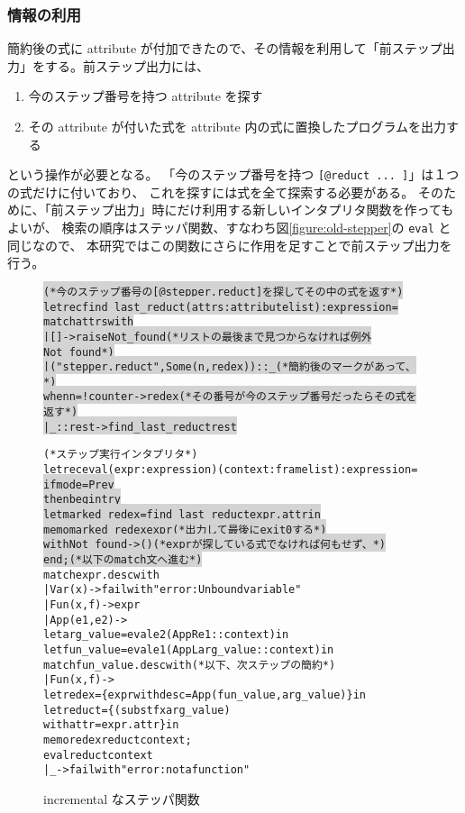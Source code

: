 \subsubsection{情報の利用}
簡約後の式に attribute が付加できたので、その情報を利用して「前ステップ出力」をする。前ステップ出力には、
\begin{enumerate}
\item 今のステップ番号を持つ attribute を探す
\item その attribute が付いた式を attribute 内の式に置換したプログラムを出力する
\end{enumerate}
という操作が必要となる。
「今のステップ番号を持つ \texttt{[@reduct ... ]}」は１つの式だけに付いており、
これを探すには式を全て探索する必要がある。
そのために、「前ステップ出力」時にだけ利用する新しいインタプリタ関数を作ってもよいが、
検索の順序はステッパ関数、すなわち図\ref{figure:old-stepper}の \texttt{eval} と同じなので、
本研究ではこの関数にさらに作用を足すことで前ステップ出力を行う。

\begin{figure}
\begin{spacing}{0.8}
\begin{alltt}
\colorbox{lightgray}{ (* 今のステップ番号の [@stepper.reduct] を探してその中の式を返す *)}
\colorbox{lightgray}{let rec find_last_reduct (attrs : attribute list) : expression =}
\colorbox{lightgray}{  match attrs with}
\colorbox{lightgray}{  | [] -> raise Not_found      (* リストの最後まで見つからなければ例外 Not_found *)}
\colorbox{lightgray}{  | ("stepper.reduct", Some (n, redex)) :: _        (* 簡約後のマークがあって、 *)}
\colorbox{lightgray}{    when n = !counter -> redex (* その番号が今のステップ番号だったらその式を返す *)}
\colorbox{lightgray}{  | _ :: rest -> find_last_reduct rest}

(* ステップ実行インタプリタ *)
let rec eval (expr : expression) (context : frame list) : expression =
\colorbox{lightgray}{  if mode = Prev}
\colorbox{lightgray}{  then begin try}
\colorbox{lightgray}{      let marked_redex = find_last_reduct expr.attr in}
\colorbox{lightgray}{      memo marked_redex expr                     (* 出力して最後に exit 0 する *)}
\colorbox{lightgray}{    with Not_found -> ()             (* expr が探している式でなければ何もせず、 *)}
\colorbox{lightgray}{  end;                                               (* 以下の match 文へ進む *)}
  match expr.desc with
    | Var (x) -> failwith "error: Unbound variable"
    | Fun (x, f) -> expr
    | App (e1, e2) ->
      let arg_value = eval e2 (AppR e1 :: context) in
      let fun_value = eval e1 (AppL arg_value :: context) in
      match fun_value.desc with                       (* 以下、次ステップの簡約 *)
        | Fun (x, f) ->
          let redex = \{expr with desc = App (fun_value, arg_value)\} in
          let reduct = \{(subst f x arg_value)
                        with attr = expr.attr\} in
          memo redex reduct context;
          eval reduct context
        | _ -> failwith "error: not a function"
\end{alltt}
\end{spacing}
\caption{incremental なステッパ関数}
\label{figure:new-stepper}
\end{figure}

